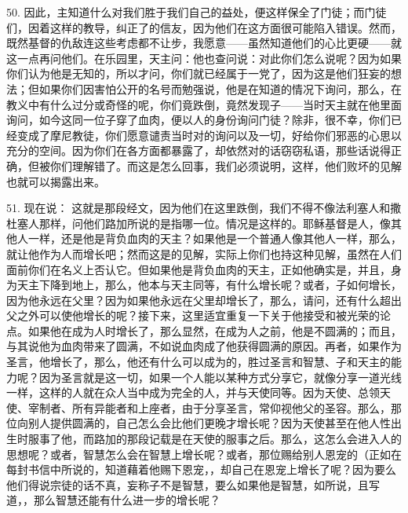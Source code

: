 50. 因此，主知道什么对我们胜于我们自己的益处，便这样保全了门徒；而门徒们，因着这样的教导，纠正了的信友，因为他们在这方面很可能陷入错误。然而，既然基督的仇敌连这些考虑都不让步，我愿意——虽然知道他们的心比更硬——就这一点再问他们。在乐园里，天主问：他也查问说：对此你们怎么说呢？因为如果你们认为他是无知的，所以才问，你们就已经属于一党了，因为这是他们狂妄的想法；但如果你们因害怕公开的名号而勉强说，他是在知道的情况下询问，那么，在教义中有什么过分或奇怪的呢，你们竟跌倒，竟然发现子——当时天主就在他里面询问，如今这同一位子穿了血肉，便以人的身份询问门徒？除非，很不幸，你们已经变成了摩尼教徒，你们愿意谴责当时对的询问以及一切，好给你们邪恶的心思以充分的空间。因为你们在各方面都暴露了，却依然对的话窃窃私语，那些话说得正确，但被你们理解错了。而这是怎么回事，我们必须说明，这样，他们败坏的见解也就可以揭露出来。\par

51. 现在说： 这就是那段经文，因为他们在这里跌倒，我们不得不像法利塞人和撒杜塞人那样，问他们路加所说的是指哪一位。情况是这样的。耶稣基督是人，像其他人一样，还是他是背负血肉的天主？如果他是一个普通人像其他人一样，那么，就让他作为人而增长吧；然而这是的见解，实际上你们也持这种见解，虽然在人们面前你们在名义上否认它。但如果他是背负血肉的天主，正如他确实是，并且，身为天主下降到地上，那么，他本与天主同等，有什么增长呢？或者，子如何增长，因为他永远在父里？因为如果他永远在父里却增长了，那么，请问，还有什么超出父之外可以使他增长的呢？接下来，这里适宜重复一下关于他接受和被光荣的论点。如果他在成为人时增长了，那么显然，在成为人之前，他是不圆满的；而且，与其说他为血肉带来了圆满，不如说血肉成了他获得圆满的原因。再者，如果作为圣言，他增长了，那么，他还有什么可以成为的，胜过圣言和智慧、子和天主的能力呢？因为圣言就是这一切，如果一个人能以某种方式分享它，就像分享一道光线一样，这样的人就在众人当中成为完全的人，并与天使同等。因为天使、总领天使、宰制者、所有异能者和上座者，由于分享圣言，常仰视他父的圣容。那么，那位向别人提供圆满的，自己怎么会比他们更晚才增长呢？因为天使甚至在他人性出生时服事了他，而路加的那段记载是在天使的服事之后。那么，这怎么会进入人的思想呢？或者，智慧怎么会在智慧上增长呢？或者，那位赐给别人恩宠的（正如在每封书信中所说的，知道藉着他赐下恩宠，，却自己在恩宠上增长了呢？因为要么他们得说宗徒的话不真，妄称子不是智慧，要么如果他是智慧，如所说，且写道，，那么智慧还能有什么进一步的增长呢？\par


